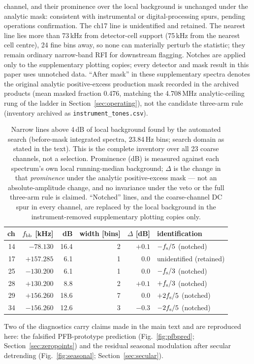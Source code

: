 channel, and their prominence over the local background is unchanged
under the analytic mask: consistent with instrumental or
digital-processing spurs, pending operations confirmation. The ch17
line is unidentified and retained. The nearest line lies more than
73\,kHz from detector-cell support (75\,kHz from the nearest cell
centre), 24 fine bins away, so none can materially perturb the
statistic; they remain ordinary narrow-band RFI for downstream
flagging. Notches are applied only to the supplementary plotting
copies; every detector and mask result in this paper uses unnotched
data. ``After mask'' in these supplementary spectra denotes the
original analytic positive-excess production mask recorded in the
archived products (mean masked fraction 0.476, matching the 4.708\,MHz
analytic-ceiling rung of the ladder in Section~\ref{sec:operating}),
not the candidate three-arm rule
(inventory archived as \texttt{instrument\_tones.csv}).

\begin{table}[b]
  \centering
  \caption{Narrow lines above 4\,dB of local background found by the
  automated search (before-mask integrated spectra, 23.84\,Hz bins;
  search domain as stated in the text). This is the complete inventory
  over all 23 coarse channels, not a selection. Prominence (dB) is measured
  against each spectrum's own local running-median background;
  $\Delta$ is the change in that \emph{prominence} under the analytic
  positive-excess mask --- not an absolute-amplitude change, and no
  invariance under the veto or the full three-arm rule is claimed.
  ``Notched'' lines, and the coarse-channel DC spur in every channel,
  are replaced by the local background in the instrument-removed
  supplementary plotting copies only.}
  \label{tab:spurs}
  \begin{tabular}{rrrrrl}
    \hline
    ch & $f_{\rm bb}$ [kHz] & dB & width [bins] & $\Delta$ [dB] &
    identification \\
    \hline
    14 & $-78.130$  & 16.4 & 2 & $+0.1$ & $-f_{\rm s}/5$ (notched) \\
    17 & $+157.285$ & 6.1  & 1 & $0.0$  & unidentified (retained) \\
    25 & $-130.200$ & 6.1  & 1 & $0.0$  & $-f_{\rm s}/3$ (notched) \\
    28 & $+130.200$ & 8.8  & 2 & $+0.1$ & $+f_{\rm s}/3$ (notched) \\
    29 & $+156.260$ & 18.6 & 7 & $0.0$  & $+2f_{\rm s}/5$ (notched) \\
    34 & $-156.260$ & 12.6 & 3 & $-0.3$ & $-2f_{\rm s}/5$ (notched) \\
    \hline
  \end{tabular}
\end{table}
Two of the diagnostics carry claims made in the main text and are
reproduced here: the falsified PFB-prototype prediction
(Fig.~\ref{fig:pfbpred}; Section~\ref{sec:zeropoints}) and the residual
seasonal modulation after secular detrending (Fig.~\ref{fig:seasonal};
Section~\ref{sec:secular}).

